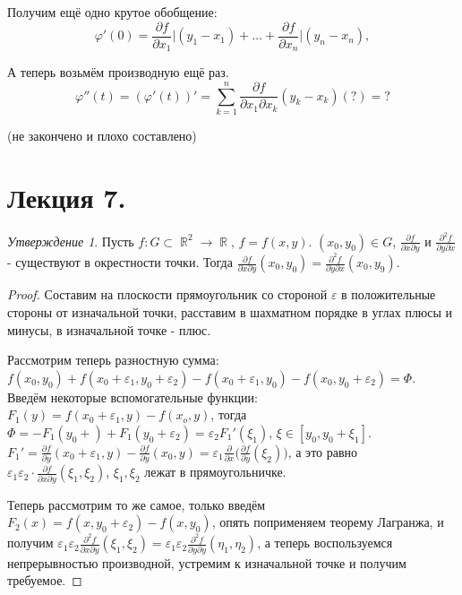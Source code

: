 \documentclass[a4paper,100pt]{article}
\theoremstyle{indented}
\theoremstyle{definition}
\theoremstyle{remark}
\newtheorem{stat}{Утверждение}
\DeclareMathOperator{\RR}{\mathbb{R}}
\begin{document}
Получим ещё одно крутое обобщение:
\[
    \varphi'(0)=\frac{\partial f}{\partial x_1}\bigg| (y_1-x_1)+\ldots +\frac{\partial f}{\partial x_n}\bigg|(y_n-x_n), 
\]

А теперь возьмём производную ещё раз. 
\[
    \varphi''(t)= (\varphi'(t))'= \sum_{k=1}^n\frac{\partial f}{\partial x_1 \partial x_k}(y_k-x_k)(?)=?
\]

(не закончено и плохо составлено)

\section{Лекция 7.}

\begin{stat}
    Пусть $f:G\subset \RR^2\rightarrow \RR$, $f=f(x, y)$. $(x_0, y_0)\in G$, $\frac{\partial f}{\partial x \partial y}$ и $\frac{\partial^2 f}{\partial y \partial x}$ - существуют в окрестности точки. Тогда $\frac{\partial f}{\partial x \partial y}(x_0, y_0)=\frac{\partial^2 f}{\partial y \partial x}(x_0, y_9)$. 
\end{stat}

\begin{proof}
    Составим на плоскости прямоугольник со стороной $\varepsilon $ в положительные стороны от изначальной точки, расставим в шахматном порядке в углах плюсы и минусы, в изначальной точке - плюс. \ 

    Рассмотрим теперь разностную сумма: $f(x_0, y_0)+f(x_0+\varepsilon_1, y_0+\varepsilon_2)-f(x_0+\varepsilon_1, y_0)- f(x_0, y_0+\varepsilon_2)= \Phi$. Введём некоторые вспомогательные функции: $F_1(y)=f(x_0+\varepsilon_1, y)-f(x_o, y)$, тогда $\Phi=-F_1(y_0+)+F_1(y_0+\varepsilon_2)= \varepsilon_2F_1'(\xi_1)$, $\xi\in[y_0, y_0+\xi_1]$. $F_1'=\frac{\partial f}{\partial y}(x_0+\varepsilon_1, y)-\frac{\partial f}{\partial y}(x_0, y)= \varepsilon_1\frac{\partial}{\partial x}\biggl(\frac{\partial f}{\partial y}(\xi_2)\biggr)$, а это равно $\varepsilon_1\varepsilon_2\cdot\frac{\partial f}{\partial x\partial y}(\xi_1, \xi_2)$, $\xi_1, \xi_2$ лежат в прямоугольничке. \ 

    Теперь рассмотрим то же самое, только введём $F_2(x)=f(x, y_0+\varepsilon_2)-f(x, y_0)$, опять поприменяем теорему Лагранжа, и получим $\varepsilon_1\varepsilon_2\frac{\partial^2 f}{\partial x \partial y}(\xi_1, \xi_2)=\varepsilon_1\varepsilon_2\frac{\partial^2 f}{\partial y \partial y}(\eta_1, \eta_2)$, а теперь воспользуемся непрерывностью производной, устремим к изначальной точке и получим требуемое.
\end{proof}
\end{document}
